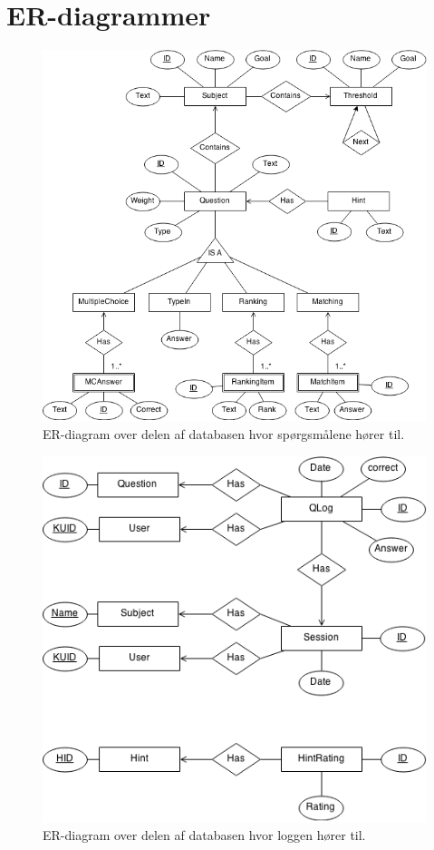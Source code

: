 \documentclass[11pt, a4paper]{article}
\begin{document}

{}

\newpage
\section{ER-diagrammer}
\label{sec:er_diagrams}
\begin{figure}[h!]
    \centering
    \includegraphics[width=0.8\linewidth]{figures/er_diagram/Qdb.png}
    \caption{ER-diagram over delen af databasen hvor spørgsmålene hører til.}
    \label{fig:er_diagram_question}
\end{figure}

\begin{figure}[h!]
    \centering
    \includegraphics[width=0.8\linewidth]{figures/er_diagram/Logdb.png}
    \caption{ER-diagram over delen af databasen hvor loggen hører til.}
    \label{fig:er_diagram_log}
\end{figure}
\end{document}
